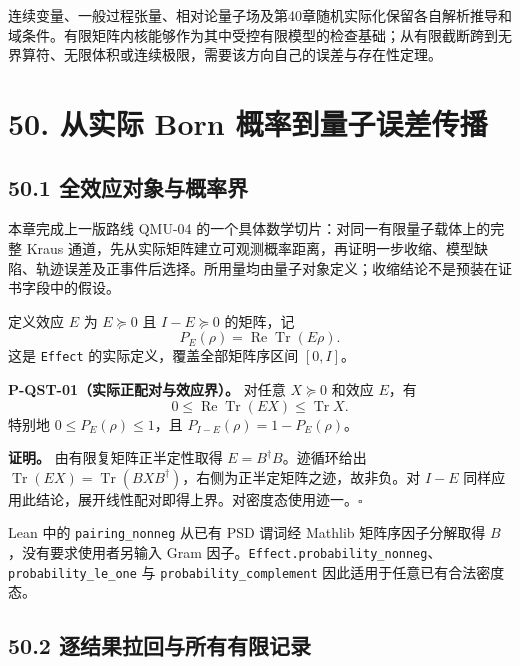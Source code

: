 \documentclass[
  11pt,
  oneside]{book}
\begin{document}
连续变量、一般过程张量、相对论量子场及第40章随机实际化保留各自解析推导和域条件。有限矩阵内核能够作为其中受控有限模型的检查基础；从有限截断跨到无界算符、无限体积或连续极限，需要该方向自己的误差与存在性定理。

\hypertarget{ch-50}{%
\chapter{50. 从实际 Born 概率到量子误差传播}\label{ch-50}}

\hypertarget{ux5168ux6548ux5e94ux5bf9ux8c61ux4e0eux6982ux7387ux754c}{%
\section{50.1
全效应对象与概率界}\label{ux5168ux6548ux5e94ux5bf9ux8c61ux4e0eux6982ux7387ux754c}}

本章完成上一版路线 QMU-04 的一个具体数学切片：对同一有限量子载体上的完整
Kraus
通道，先从实际矩阵建立可观测概率距离，再证明一步收缩、模型缺陷、轨迹误差及正事件后选择。所用量均由量子对象定义；收缩结论不是预装在证书字段中的假设。

定义效应 \(E\) 为 \(E\succeq0\) 且 \(I-E\succeq0\) 的矩阵，记 \[
P_E(\rho)=\operatorname{Re}\operatorname{Tr}(E\rho).
\] 这是 \texttt{Effect} 的实际定义，覆盖全部矩阵序区间 \([0,I]\)。

\protect\hypertarget{p-qst-01}{}{}

\textbf{P-QST-01（实际正配对与效应界）。} 对任意 \(X\succeq0\) 和效应
\(E\)，有 \[
0\le\operatorname{Re}\operatorname{Tr}(EX)\le\operatorname{Tr}X.
\] 特别地 \(0\le P_E(\rho)\le1\)，且 \(P_{I-E}(\rho)=1-P_E(\rho)\)。

\textbf{证明。} 由有限复矩阵正半定性取得 \(E=B^\dagger B\)。迹循环给出
\(\operatorname{Tr}(EX)=\operatorname{Tr}(BXB^\dagger)\)，右侧为正半定矩阵之迹，故非负。对
\(I-E\)
同样应用此结论，展开线性配对即得上界。对密度态使用迹一。\(\square\)

Lean 中的 \texttt{pairing\_\allowbreak nonneg} 从已有 PSD 谓词经 Mathlib
矩阵序因子分解取得 \(B\)，没有要求使用者另输入 Gram
因子。\texttt{Effect.probability\_\allowbreak nonneg}、\allowbreak \texttt{probability\_\allowbreak le\_\allowbreak one}
与 \texttt{probability\_\allowbreak complement} 因此适用于任意已有合法密度态。

\hypertarget{ux9010ux7ed3ux679cux62c9ux56deux4e0eux6240ux6709ux6709ux9650ux8bb0ux5f55}{%
\section{50.2
逐结果拉回与所有有限记录}\label{ux9010ux7ed3ux679cux62c9ux56deux4e0eux6240ux6709ux6709ux9650ux8bb0ux5f55}}
\end{document}
